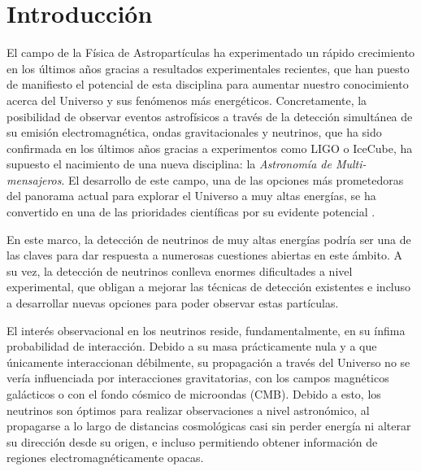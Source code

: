 \documentclass[11 pt, a4paper]{article} %
\numberwithin{equation}{section}
\numberwithin{figure}{section}
\numberwithin{table}{section}
\begin{document}
	\section{Introducción}\label{sec1}
	El campo de la Física de Astropartículas ha experimentado un rápido crecimiento en los últimos años gracias a resultados experimentales recientes, que han puesto de manifiesto el potencial de esta disciplina para aumentar nuestro conocimiento acerca del Universo y sus fenómenos más energéticos. Concretamente, la posibilidad de observar eventos astrofísicos a través de la detección simultánea de su emisión electromagnética, ondas gravitacionales y neutrinos, que ha sido confirmada en los últimos años gracias a experimentos como LIGO o IceCube, ha supuesto el nacimiento de una nueva disciplina: la \textit{Astronomía de Multi-mensajeros}. El desarrollo de este campo, una de las opciones más prometedoras del panorama actual para explorar el Universo a muy altas energías, se ha convertido en una de las prioridades científicas por su evidente potencial \cite{neronov2019introduction}.
	
	En este marco, la detección de neutrinos de muy altas energías podría ser una de las claves para dar respuesta a numerosas cuestiones abiertas en este ámbito. A su vez, la detección de neutrinos conlleva enormes dificultades a nivel experimental, que obligan a mejorar las técnicas de detección existentes e incluso a desarrollar nuevas opciones para poder observar estas partículas.
	
	El interés observacional en los neutrinos reside, fundamentalmente, en su ínfima probabilidad de interacción. Debido a su masa prácticamente nula y a que únicamente interaccionan débilmente, su propagación a través del Universo no se vería influenciada por interacciones gravitatorias, con los campos magnéticos galácticos o con el fondo cósmico de microondas (CMB). Debido a esto, los neutrinos son óptimos para realizar observaciones a nivel astronómico, al propagarse a lo largo de distancias cosmológicas casi sin perder energía ni alterar su dirección desde su origen, e incluso permitiendo obtener información de regiones electromagnéticamente opacas.
	
\end{document}
